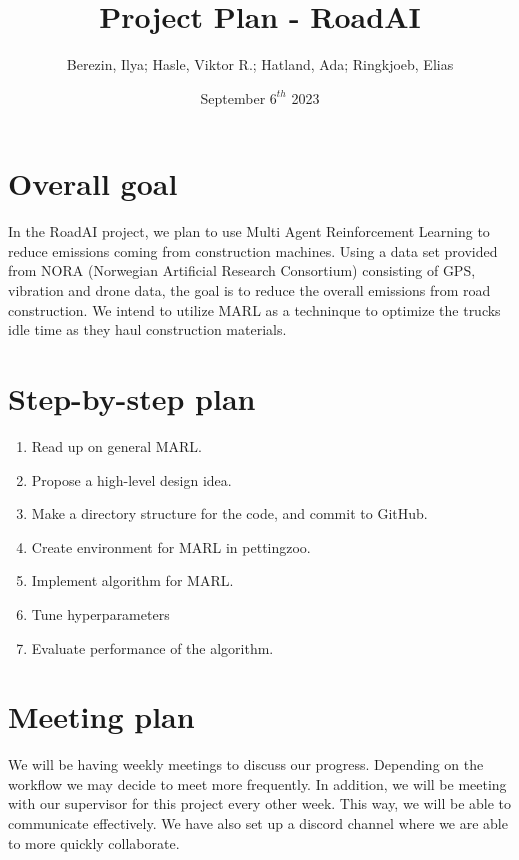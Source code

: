 \documentclass{article}
\title{Project Plan - RoadAI}
\author{Berezin, Ilya; Hasle, Viktor R.; Hatland, Ada; Ringkjoeb, Elias}
\date{September $6^{th}$ 2023}
\begin{document}
\maketitle

\section{Overall goal}
In the RoadAI project, we plan to use Multi Agent Reinforcement Learning to reduce emissions coming from
construction machines. Using a data set provided from NORA (Norwegian Artificial Research Consortium) consisting of GPS, vibration and drone data, the goal is to reduce the overall emissions from road construction. We intend to utilize MARL as a techninque to optimize
the trucks idle time as they haul construction materials.

\section{Step-by-step plan}
\begin{enumerate}
  \item Read up on general MARL.
  \item Propose a high-level design idea.
  \item Make a directory structure for the code, and commit to GitHub.
  \item Create environment for MARL in pettingzoo.
  \item Implement algorithm for MARL. 
  \item Tune hyperparameters
  \item Evaluate performance of the algorithm.
\end{enumerate}

\section{Meeting plan}
We will be having weekly meetings to discuss our progress. Depending on the workflow we may decide to 
meet more frequently. In addition, we will be meeting with our supervisor for this project every other week. This way,
we will be able to communicate effectively. We have also set up a discord channel where we are able to more quickly collaborate.
\end{document}
